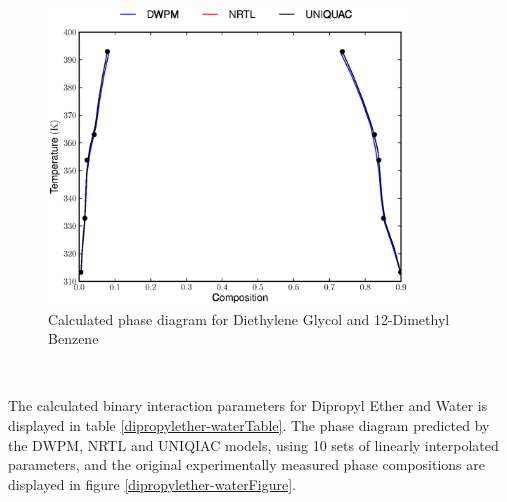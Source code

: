 \begin{figure}[hp]
\centering
\includegraphics[width = 0.85\textwidth]{Results_Parts/BinaryParams/diethyleneglycol-12-dimethylbenzene/PhaseDiagram.eps}
\caption{Calculated phase diagram for Diethylene Glycol and 12-Dimethyl Benzene} \label{diethyleneglycol-12-dimethylbenzeneFigure}
\end{figure}\

\clearpage


The calculated binary interaction parameters for  Dipropyl Ether and Water is displayed in table \ref{dipropylether-waterTable}. The phase diagram predicted by the DWPM, NRTL and UNIQIAC models, using 10 sets of linearly interpolated parameters, and the original experimentally measured phase compositions are displayed in figure \ref{dipropylether-waterFigure}.\\

